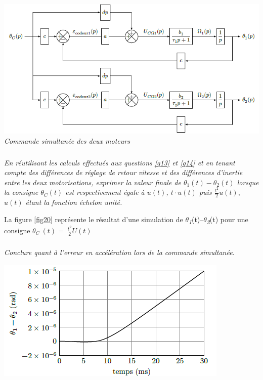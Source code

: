\documentclass[10pt,fleqn]{article} %
\begin{document}
\begin{multicols}{2}
\begin{center}
\includegraphics[width=1.0\linewidth]{images/image20.png}
\textit{Commande simultanée des deux moteurs \label{fig19}}
\end{center}


\subparagraph{}\textit{En réutilisant les calculs effectués aux questions \ref{q13} et \ref{q14} et en
  tenant compte des différences de réglage de retour vitesse et des
  différences d'inertie entre les deux motorisations, exprimer la valeur
  finale de $\theta_1(t)-\theta_2(t)$ lorsque la consigne $\theta_C(t)$ est respectivement
  égale à $u(t)$, $t\cdot u(t)$ puis \(\frac{t^{2}}{2}u(t),\) $u(t)$ étant la
  fonction échelon unité.}
\ifprof
\begin{corrige}
\end{corrige}
\else
\fi

La figure \ref{fig20} représente le résultat d'une simulation de
$\theta$\emph{\textsubscript{1}}(t)--$\theta$\emph{\textsubscript{2}}(t) pour une
consigne \(\theta_{C}\ \left( t \right) = \ \frac{t^{2}}{2}U(t)\)

\subparagraph{}\textit{Conclure quant à l'erreur en accélération lors de la commande
  simultanée.}
\ifprof
\begin{corrige}
\end{corrige}
\else
\fi


\begin{center}
\includegraphics[width=\linewidth]{images/image21.png}


\end{center}
\end{multicols}
\end{document}
